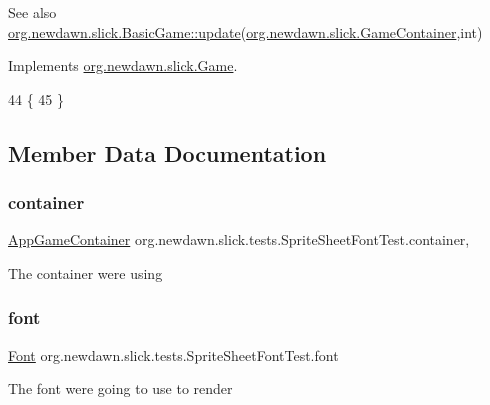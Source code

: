 \begin{DoxySeeAlso}{See also}
\mbox{\hyperlink{classorg_1_1newdawn_1_1slick_1_1_basic_game_acfe6fa05aef83bff1631af91a3e4bd20}{org.\+newdawn.\+slick.\+Basic\+Game\+::update}}(\mbox{\hyperlink{classorg_1_1newdawn_1_1slick_1_1_game_container}{org.\+newdawn.\+slick.\+Game\+Container}},int) 
\end{DoxySeeAlso}


Implements \mbox{\hyperlink{interfaceorg_1_1newdawn_1_1slick_1_1_game_ab07b2e9463ee4631620dde0de25bdee8}{org.\+newdawn.\+slick.\+Game}}.


\begin{DoxyCode}
44                                                                                 \{
45    \}
\end{DoxyCode}


\subsection{Member Data Documentation}
\mbox{\label{classorg_1_1newdawn_1_1slick_1_1tests_1_1_sprite_sheet_font_test_a815648868b0f6ece0eb2952a1faeaedf}} 
\subsubsection{\texorpdfstring{container}{container}}
{\footnotesize\ttfamily \mbox{\hyperlink{classorg_1_1newdawn_1_1slick_1_1_app_game_container}{App\+Game\+Container}} org.\+newdawn.\+slick.\+tests.\+Sprite\+Sheet\+Font\+Test.\+container\hspace{0.3cm}{\ttfamily [static]}, {\ttfamily [private]}}

The container we\textquotesingle{}re using \mbox{\label{classorg_1_1newdawn_1_1slick_1_1tests_1_1_sprite_sheet_font_test_a910b79c0adb99fde6f3122070d2a9dfa}} 
\subsubsection{\texorpdfstring{font}{font}}
{\footnotesize\ttfamily \mbox{\hyperlink{interfaceorg_1_1newdawn_1_1slick_1_1_font}{Font}} org.\+newdawn.\+slick.\+tests.\+Sprite\+Sheet\+Font\+Test.\+font\hspace{0.3cm}{\ttfamily [private]}}

The font we\textquotesingle{}re going to use to render 